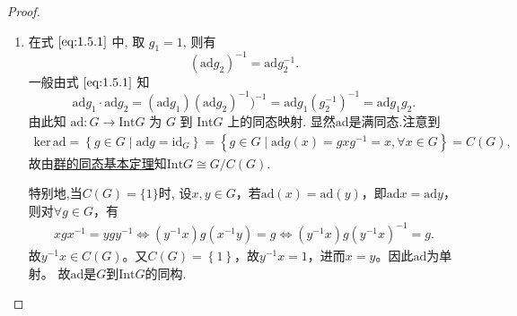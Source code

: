 \documentclass[../../main.tex]{subfiles}%
\begin{document}
\begin{proof}
\begin{enumerate}[(1)]
\item 在式 \(\eqref{eq:1.5.1}\) 中, 取 \( g_1 = 1 \), 则有
\[
(\text{ad}g_2)^{-1} = \text{ad}g_2^{-1}.
\]
一般由式 \(\eqref{eq:1.5.1}\) 知
\[
\text{ad}g_1 \cdot \text{ad}g_2 = (\text{ad}g_1)(\text{ad}g_2)^{-1})^{-1} = \text{ad}g_1(g_2^{-1})^{-1} = \text{ad}g_1g_2.
\]
由此知 \( \text{ad}: G \to \text{Int}G \) 为 \( G \) 到 \( \text{Int}G \) 上的同态映射.
显然$\text{ad}$是满同态.注意到
\begin{align*}
\mathrm{ker}\,\mathrm{ad}=\left\{ g\in G\mid \mathrm{ad}g=\mathrm{id}_G \right\} =\left\{ g\in G\mid \mathrm{ad}g\left( x \right) =gxg^{-1}=x,\forall x\in G \right\} =C\left( G \right) ,
\end{align*}
故由\hyperref[theorem:群的同态基本定理]{群的同态基本定理}知$\mathrm{Int}G\cong G/C\left( G \right)$.

特别地,当$C(G)=\{1\}$时,
设$x,y\in G$，若$\mathrm{ad}(x)=\mathrm{ad}(y)$，即$\mathrm{ad}x=\mathrm{ad}y$，则对$\forall g\in G$，有
\begin{align*}
xgx^{-1}=ygy^{-1}\Longleftrightarrow \left( y^{-1}x \right) g\left( x^{-1}y \right) =g\Longleftrightarrow \left( y^{-1}x \right) g\left( y^{-1}x \right) ^{-1}=g.
\end{align*}
故$y^{-1}x\in C\left( G \right)$。又$C\left( G \right) =\left\{ 1 \right\}$，故$y^{-1}x=1$，进而$x=y$。因此$\mathrm{ad}$为单射。
故$\text{ad}$是$G$到$\text{Int}G$的同构.
\end{enumerate}
\end{proof}
\end{document}
